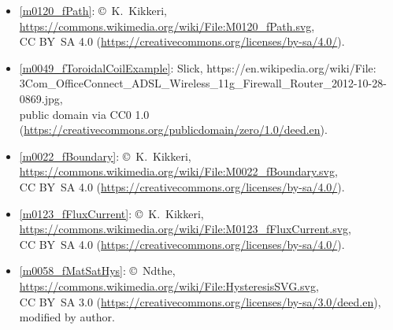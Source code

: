 \begin{itemize}
\item[Fig.] \label{m0120_fPath_Credit}
  \ref{m0120_fPath}:
  \copyright~K.\ Kikkeri, 
  \url{https://commons.wikimedia.org/wiki/File:M0120_fPath.svg},\\ 
  CC BY~SA 4.0 (\url{https://creativecommons.org/licenses/by-sa/4.0/}).

\item[Fig.] \label{m0049_fToroidalCoilExample_Credit}
  \ref{m0049_fToroidalCoilExample}:
  Slick, 
  https://en.wikipedia.org/wiki/File:\\ 
     3Com\_OfficeConnect\_ADSL\_Wireless\_11g\_Firewall\_Router\_2012-10-28-0869.jpg,\\ 
  public domain via CC0 1.0 (\url{https://creativecommons.org/publicdomain/zero/1.0/deed.en}).

\item[Fig.] \label{m0022_fBoundary_Credit}
  \ref{m0022_fBoundary}:
  \copyright~K.\ Kikkeri, 
  \url{https://commons.wikimedia.org/wiki/File:M0022_fBoundary.svg},\\ 
  CC BY~SA 4.0 (\url{https://creativecommons.org/licenses/by-sa/4.0/}).

\item[Fig.] \label{m0123_fFluxCurrent_Credit}
  \ref{m0123_fFluxCurrent}:
  \copyright~K.\ Kikkeri, 
  \url{https://commons.wikimedia.org/wiki/File:M0123_fFluxCurrent.svg},\\ 
  CC BY~SA 4.0 (\url{https://creativecommons.org/licenses/by-sa/4.0/}).

\item[Fig.] \label{m0058_fMatSatHys_Credit}
  \ref{m0058_fMatSatHys}:
  \copyright~Ndthe, 
  \url{https://commons.wikimedia.org/wiki/File:HysteresisSVG.svg},\\ 
  CC BY~SA 3.0 (\url{https://creativecommons.org/licenses/by-sa/3.0/deed.en}), 
  modified by author.

\end{itemize}

\twocolumn
